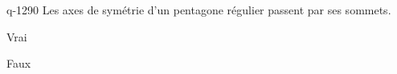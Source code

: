 \begin{truefalse}{q-1290}
Les axes de symétrie d'un pentagone régulier passent par ses sommets.
\item* Vrai
\item Faux
\end{truefalse}

